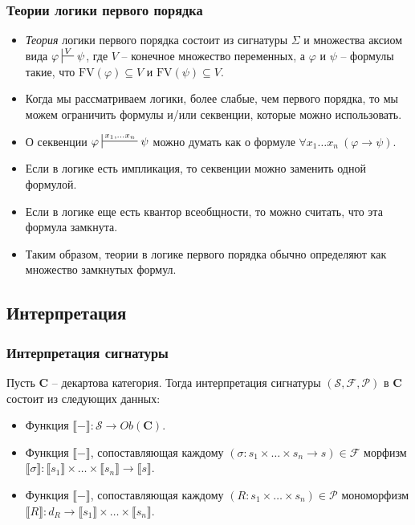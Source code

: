 \documentclass{beamer}
\theoremstyle{definition}
\newcommand{\cat}[1]{\mathbf{#1}}
\renewcommand{\C}{\cat{C}}
\renewcommand{\ll}{\llbracket}
\newcommand{\rr}{\rrbracket}
\newcommand{\fs}[1]{\mathrm{#1}}
\begin{document}
\begin{frame}
\frametitle{Теории логики первого порядка}
\begin{itemize}
\item \emph{Теория} логики первого порядка состоит из сигнатуры $\Sigma$ и множества аксиом вида $\varphi \sststile{}{V} \psi$,
где $V$ -- конечное множество переменных, а $\varphi$ и $\psi$ -- формулы такие, что $\fs{FV}(\varphi) \subseteq V$ и $\fs{FV}(\psi) \subseteq V$.
\item Когда мы рассматриваем логики, более слабые, чем первого порядка, то мы можем ограничить формулы и/или секвенции, которые можно использовать.
\item О секвенции $\varphi \sststile{}{x_1, \ldots x_n} \psi$ можно думать как о формуле $\forall x_1 \ldots x_n\ (\varphi \to \psi)$.
\item Если в логике есть импликация, то секвенции можно заменить одной формулой.
\item Если в логике еще есть квантор всеобщности, то можно считать, что эта формула замкнута.
\item Таким образом, теории в логике первого порядка обычно определяют как множество замкнутых формул.
\end{itemize}
\end{frame}

\subsection{Интерпретация}

\begin{frame}
\frametitle{Интерпретация сигнатуры}
Пусть $\C$ -- декартова категория.
Тогда интерпретация сигнатуры $(\mathcal{S},\mathcal{F},\mathcal{P})$ в $\C$ состоит из следующих данных:
\begin{itemize}
\item Функция $\ll - \rr : \mathcal{S} \to Ob(\C)$.
\item Функция $\ll - \rr$, сопоставляющая каждому $(\sigma : s_1 \times \ldots \times s_n \to s) \in \mathcal{F}$
морфизм $\ll \sigma \rr : \ll s_1 \rr \times \ldots \times \ll s_n \rr \to \ll s \rr$.
\item Функция $\ll - \rr$, сопоставляющая каждому $(R : s_1 \times \ldots \times s_n) \in \mathcal{P}$
мономорфизм $\ll R \rr : d_R \to \ll s_1 \rr \times \ldots \times \ll s_n \rr$.
\end{itemize}
\end{frame}
\end{document}
